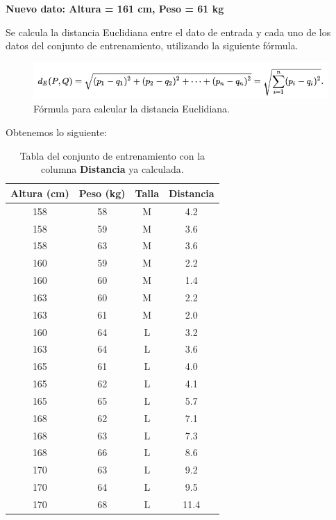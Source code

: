 \begin{UClist}
	\textbf{Nuevo dato: Altura = 161 cm, Peso = 61 kg}

	\UCli Se calcula la distancia Euclidiana entre el dato de entrada y cada uno de los datos del conjunto de entrenamiento, utilizando la siguiente fórmula.\\

	\begin{figure}[H]
		\begin{center}
			\hypertarget{fig:distanciaEuclidiana}{\hspace{1pt}}
			\includegraphics{capitulo2/images/distanciaEuclidiana.png}
			\caption{Fórmula para calcular la distancia Euclidiana.}
			\label{fig:distanciaEuclidiana}
		\end{center}
	\end{figure}

	Obtenemos lo siguiente:\\

	\begin{table}[H]
		\begin{center}
			\label{tab:tablaKNNDistancias}
			\begin{tabular}{c|c|c|c}
				\textbf{Altura (cm)} & \textbf{Peso (kg)} & \textbf{Talla} & \textbf{Distancia}\\
				\hline
				158 & 58 & M & 4.2\\
				158 & 59 & M & 3.6\\
				158 & 63 & M & 3.6\\
				160 & 59 & M & 2.2\\
				160 & 60 & M & 1.4\\
				163 & 60 & M & 2.2\\
				163 & 61 & M & 2.0\\
				160 & 64 & L & 3.2\\
				163 & 64 & L & 3.6\\
				165 & 61 & L & 4.0\\
				165 & 62 & L & 4.1\\
				165 & 65 & L & 5.7\\
				168 & 62 & L & 7.1\\
				168 & 63 & L & 7.3\\
				168 & 66 & L & 8.6\\
				170 & 63 & L & 9.2\\
				170 & 64 & L & 9.5\\
				170 & 68 & L & 11.4\\
			\end{tabular}
		\end{center}
		\caption{Tabla del conjunto de entrenamiento con la columna \textbf{Distancia} ya calculada.}
	\end{table}


\end{UClist}
